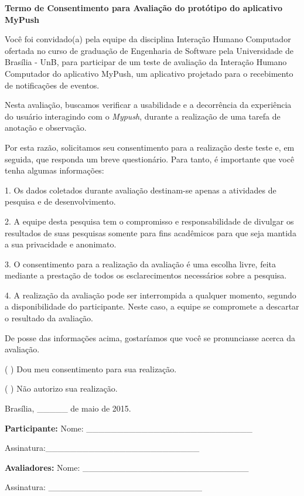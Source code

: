       \begin{center}
      
       \textbf{Termo de Consentimento para Avaliação do protótipo do aplicativo MyPush}
       
      \end{center}
      
      Você foi convidado(a) pela equipe da disciplina Interação Humano Computador ofertada no curso de graduação de Engenharia de Software 
      pela Universidade de Brasília - UnB, para participar de um teste de avaliação da Interação Humano Computador do aplicativo MyPush, 
      um aplicativo projetado para o recebimento de notificações de eventos.
      
      Nesta avaliação, buscamos verificar a usabilidade e a decorrência da experiência do usuário interagindo com o \textit{Mypush}, durante a 
      realização de uma tarefa de anotação e observação.

      Por esta razão, solicitamos seu consentimento para a realização deste teste e, em seguida, que responda um breve questionário. 
      Para tanto, é importante que você tenha algumas informações: 
      
      1. Os dados coletados durante avaliação destinam-se apenas a atividades de pesquisa e de desenvolvimento.
      
      2. A equipe desta pesquisa tem o compromisso e responsabilidade de divulgar os resultados de suas pesquisas somente para fins acadêmicos 
      para que seja mantida a sua privacidade e anonimato. 
      
      3. O consentimento para a realização da avaliação é uma escolha livre, feita mediante a prestação de todos os esclarecimentos necessários 
      sobre a pesquisa.
      
      4. A realização da avaliação pode ser interrompida a qualquer momento, segundo a disponibilidade do participante. Neste caso, a equipe se 
      compromete a descartar o resultado da avaliação.
      
      De posse das informações acima, gostaríamos que você se pronunciasse acerca da avaliação.
      
      ( ) Dou meu consentimento para sua realização. 
      
      ( ) Não autorizo sua realização. 
      
      \begin{flushright}
      
      Brasília, \_\_\_\_\_ de maio de 2015. 
      
      \textbf{Participante:}  Nome: \_\_\_\_\_\_\_\_\_\_\_\_\_\_\_\_\_\_\_\_\_\_\_\_\_\_\_ 
      
      Assinatura:\_\_\_\_\_\_\_\_\_\_\_\_\_\_\_\_\_\_\_\_\_\_\_\_\_  
      
        \textbf{Avaliadores:}  Nome: \_\_\_\_\_\_\_\_\_\_\_\_\_\_\_\_\_\_\_\_\_\_\_\_\_\_\_ 
        
         Assinatura: \_\_\_\_\_\_\_\_\_\_\_\_\_\_\_\_\_\_\_\_\_\_\_\_\_ 
      
       \end{flushright}
